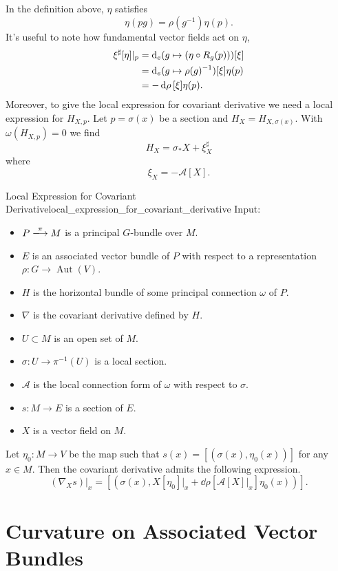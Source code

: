\documentclass{article}
\begin{document}
In the definition above, $\eta$ satisfies
\[ \eta(pg) = \rho(g^{-1})\eta(p). \]
It's useful to note how fundamental vector fields act on $\eta$,
\begin{align}
    \xi^\sharp[\eta]\vert_p &= \dd_e{(g\mapsto (\eta\circ R_g(p)))}[\xi] \notag \\
    &= \dd_e{(g\mapsto \rho(g)^{-1})}[\xi] \eta(p) \notag \\
    \label{eq:fundamental_vector_field_on_associated_vector_field} &= -\dd{\rho}[\xi] \eta(p).
\end{align}
Moreover, to give the local expression for covariant derivative we need a local expression for $H_{X,p}$.
Let $p = \sigma(x)$ be a section and $H_X = H_{X, \sigma(x)}$.
With $\omega(H_{X,p}) = 0$ we find
\[ H_{X} = \sigma_* X + \xi^\sharp_X \]
where
\[ \xi_X = -\mathcal{A}[X]. \]

\begin{proposition}{Local Expression for Covariant Derivative}{local_expression_for_covariant_derivative}
    Input:
    \begin{itemize}
        \item $P\xlongrightarrow{\pi} M$ is a principal $G$-bundle over $M$.
        \item $E$ is an associated vector bundle of $P$ with respect to a representation $\rho: G\rightarrow \operatorname{Aut}(V)$.
        \item $H$ is the horizontal bundle of some principal connection $\omega$ of $P$.
        \item $\nabla$ is the covariant derivative defined by $H$.
        \item $U\subset M$ is an open set of $M$.
        \item $\sigma: U \rightarrow \pi^{-1}(U)$ is a local section.
        \item $\mathcal{A}$ is the local connection form of $\omega$ with respect to $\sigma$.
        \item $s: M \rightarrow E$ is a section of $E$.
        \item $X$ is a vector field on $M$.
    \end{itemize}
    Let $\eta_0: M \rightarrow V$ be the map such that $s(x) = [(\sigma(x), \eta_0(x))]$ for any $x\in M$.
    Then the covariant derivative admits the following expression.
    \[ (\nabla_X s)\vert_{x} = [(\sigma(x), X[\eta_0]\vert_x + \dd{\rho}[\mathcal{A}[X]\vert_x]\eta_0(x))]. \]
\end{proposition}

\section{Curvature on Associated Vector Bundles}
\end{document}
